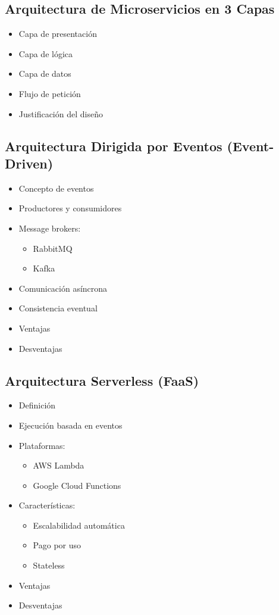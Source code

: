 \subsection{Arquitectura de Microservicios en 3 Capas}
\begin{itemize}
    \item Capa de presentación
    \item Capa de lógica
    \item Capa de datos
    \item Flujo de petición
    \item Justificación del diseño
\end{itemize}

\subsection{Arquitectura Dirigida por Eventos (Event-Driven)}
\begin{itemize}
    \item Concepto de eventos
    \item Productores y consumidores
    \item Message brokers:
    \begin{itemize}
        \item RabbitMQ
        \item Kafka
    \end{itemize}
    \item Comunicación asíncrona
    \item Consistencia eventual
    \item Ventajas
    \item Desventajas
\end{itemize}

\subsection{Arquitectura Serverless (FaaS)}
\begin{itemize}
    \item Definición
    \item Ejecución basada en eventos
    \item Plataformas:
    \begin{itemize}
        \item AWS Lambda
        \item Google Cloud Functions
    \end{itemize}
    \item Características:
    \begin{itemize}
        \item Escalabilidad automática
        \item Pago por uso
        \item Stateless
    \end{itemize}
    \item Ventajas
    \item Desventajas
\end{itemize}

